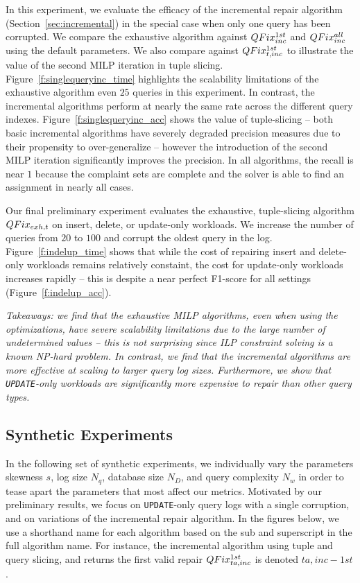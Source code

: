 In this experiment, we evaluate the efficacy of the incremental repair algorithm (Section~\ref{sec:incremental})
in the special case when only one query has been corrupted.  We compare the exhaustive 
algorithm against $QFix_{inc}^{1st}$ and $QFix_{inc}^{all}$ using the default parameters.
We also compare against $QFix_{t,inc}^{1st}$ to illustrate the value of the second MILP iteration in tuple slicing.
Figure~\ref{f:singlequeryinc_time} highlights the scalability limitations of the exhaustive algorithm 
even $25$ queries in this experiment.  In contrast, the incremental algorithms perform at nearly the same rate
across the different query indexes.  Figure~\ref{f:singlequeryinc_acc} shows the value of tuple-slicing --
both basic incremental algorithms have severely degraded precision measures due to their propensity to over-generalize
-- however the introduction of the second MILP iteration significantly improves the precision.  
In all algorithms, the recall is near $1$ because the complaint sets are complete and the solver is able to find 
an assignment in nearly all cases.


\label{sec:indelup}
Our final preliminary experiment evaluates the exhaustive, tuple-slicing algorithm 
$QFix_{exh,t}$ on insert, delete, or update-only workloads.
We increase the number of queries from $20$ to $100$ and corrupt the oldest query in the log.  
Figure~\ref{f:indelup_time} shows that while the cost of repairing insert and delete-only workloads
remains relatively constaint, the cost for update-only workloads increases rapidly -- this is
despite a near perfect F1-score for all settings (Figure~\ref{f:indelup_acc}).


{\it Takeaways: we find that the exhaustive MILP algorithms, even when using the optimizations,
have severe scalability limitations due to the large number of undetermined values -- this is not surprising
since ILP constraint solving is a known NP-hard problem.
In contrast, we find that the incremental algorithms are more effective at scaling to larger query log sizes.  
Furthermore, we show that \texttt{UPDATE}-only workloads are significantly more expensive to repair than other 
query types.
}


\subsection{Synthetic Experiments}
In the following set of synthetic experiments, we individually vary 
the parameters skewness $s$, log size $N_q$, database size $N_D$, and
query complexity $N_w$ in order to tease apart the parameters that most affect our metrics.
Motivated by our preliminary results, we focus on \texttt{UPDATE}-only query logs with a single corruption,
and on variations of the incremental repair algorithm.   In the figures below,
we use a shorthand name for each algorithm based on the sub and superscript in the full algorithm name.  
For instance, the incremental algorithm using tuple and query slicing, and returns the first valid repair
$QFix_{ta,inc}^{1st}$ is denoted $ta,inc-1st$.  



